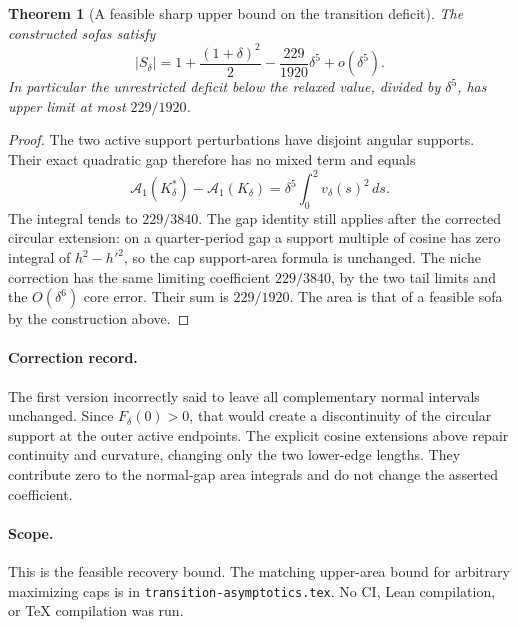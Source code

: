 \documentclass[11pt]{article}
\newtheorem{theorem}{Theorem}
\begin{document}
\begin{theorem}[A feasible sharp upper bound on the transition deficit]
The constructed sofas satisfy
\[
 |S_\delta|=1+\frac{(1+\delta)^2}{2}-\frac{229}{1920}\delta^5+o(\delta^5).
\]
In particular the unrestricted deficit below the relaxed value, divided by $\delta^5$, has upper limit at most $229/1920$.
\end{theorem}
\begin{proof}
The two active support perturbations have disjoint angular supports. Their exact quadratic gap therefore has no mixed term and equals
\[
 \mathcal A_1(K_\delta^*)-\mathcal A_1(K_\delta)=\delta^5\int_0^2v_\delta(s)^2\,ds.
\]
The integral tends to $229/3840$. The gap identity still applies after the corrected circular extension: on a quarter-period gap a support multiple of cosine has zero integral of $h^2-h'^2$, so the cap support-area formula is unchanged. The niche correction has the same limiting coefficient $229/3840$, by the two tail limits and the $O(\delta^6)$ core error. Their sum is $229/1920$. The area is that of a feasible sofa by the construction above.
\end{proof}

\paragraph{Correction record.}
The first version incorrectly said to leave all complementary normal intervals unchanged. Since $F_\delta(0)>0$, that would create a discontinuity of the circular support at the outer active endpoints. The explicit cosine extensions above repair continuity and curvature, changing only the two lower-edge lengths. They contribute zero to the normal-gap area integrals and do not change the asserted coefficient.

\paragraph{Scope.}
This is the feasible recovery bound. The matching upper-area bound for arbitrary maximizing caps is in \texttt{transition-asymptotics.tex}. No CI, Lean compilation, or TeX compilation was run.
\end{document}
